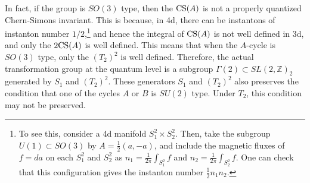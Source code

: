 \documentclass[a4paper,11pt]{article}
\def\BZ{{\mathbb Z}}
\begin{document}
In fact, if the group is $SO(3)$ type, then the ${\rm CS}(A)$ is not a properly quantized Chern-Simons invariant.
This is because, in 4d, there can be instantons of instanton number $1/2$,\footnote{
To see this, consider a 4d manifold $ S^2_1 \times S^2_2$.
Then, take the subgroup $U(1) \subset SO(3)$ by $A=\frac{1}{2}(a, -a)$, and include the magnetic fluxes of $f = da$
on each $S^2_1$ and $S^2_2$ as $n_1 = \frac{1}{2\pi}\int_{S^2_1} f$ and $n_2 = \frac{1}{2\pi}\int_{S^2_2} f$. 
One can check that this configuration gives the instanton number $\frac{1}{2}n_1 n_2$.}
and hence 
the integral of ${\rm CS}(A)$ is not well defined in 3d, and only the $2{\rm CS}(A)$ is well defined. This means that when the $A$-cycle is $SO(3)$ type,
only the $(T_2)^2$ is well defined. Therefore, the actual transformation group at the quantum level is a subgroup $\Gamma(2) \subset SL(2,\BZ)_2$
generated by $S_1$ and $(T_2)^2$. These generators $S_1$ and $(T_2)^2$ also preserves the condition that one of the 
cycles $A$ or $B$ is $SU(2)$ type. Under $T_2$, this condition may not be preserved.
\end{document}
